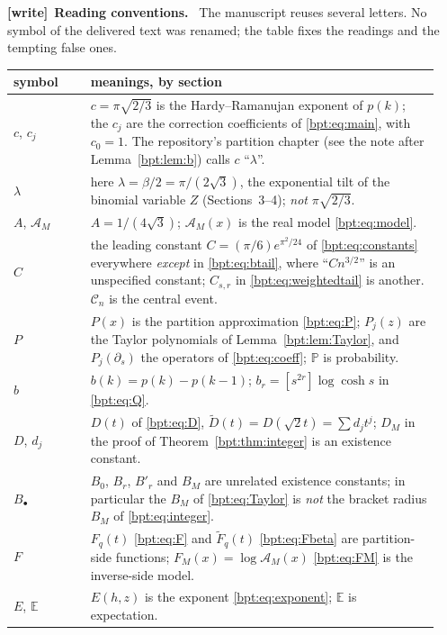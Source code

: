 \documentclass[11pt]{article}
\theoremstyle{remark}\newtheorem{remark}[theorem]{Remark}
\newcommand{\E}{\mathbb E}\newcommand{\Prb}{\mathbb P}
\newenvironment{writenote}[1][]{\par\smallskip\begingroup\small
 \noindent\textbf{[write]}\if\relax\detokenize{#1}\relax\else~\textbf{#1.}\fi\ }%
 {\par\endgroup\smallskip}
\begin{document}
\begin{writenote}[Reading conventions]
The manuscript reuses several letters. No symbol of the delivered text was
renamed; the table fixes the readings and the tempting false ones.

\smallskip
\noindent\begin{tabular}{@{}>{\raggedright\arraybackslash}p{0.17\linewidth}
 >{\raggedright\arraybackslash}p{0.77\linewidth}@{}}
\toprule
symbol & meanings, by section \\
\midrule
$c$, $c_j$ & $c=\pi\sqrt{2/3}$ is the Hardy--Ramanujan exponent of $p(k)$;
 the $c_j$ are the correction coefficients of \eqref{bpt:eq:main}, with
 $c_0=1$. The repository's partition chapter (see the note after
 Lemma~\ref{bpt:lem:b}) calls $c$ ``$\lambda$''. \\
$\lambda$ & here $\lambda=\beta/2=\pi/(2\sqrt3)$, the exponential tilt of the
 binomial variable $Z$ (Sections~3--4); \emph{not} $\pi\sqrt{2/3}$. \\
$A$, $\mathcal A_M$ & $A=1/(4\sqrt3)$; $\mathcal A_M(x)$ is the real model
 \eqref{bpt:eq:model}. \\
$C$ & the leading constant $C=(\pi/6)e^{\pi^2/24}$ of \eqref{bpt:eq:constants}
 everywhere \emph{except} in \eqref{bpt:eq:btail}, where ``$C n^{3/2}$'' is
 an unspecified constant; $C_{s,r}$ in \eqref{bpt:eq:weightedtail} is
 another. $\mathcal C_n$ is the central event. \\
$P$ & $P(x)$ is the partition approximation \eqref{bpt:eq:P}; $P_j(z)$ are
 the Taylor polynomials of Lemma~\ref{bpt:lem:Taylor}, and $P_j(\partial_s)$
 the operators of \eqref{bpt:eq:coeff}; $\Prb$ is probability. \\
$b$ & $b(k)=p(k)-p(k-1)$; $b_r=[s^{2r}]\log\cosh s$ in \eqref{bpt:eq:Q}. \\
$D$, $d_j$ & $D(t)$ of \eqref{bpt:eq:D}, $\widetilde D(t)=D(\sqrt2t)=\sum d_jt^j$;
 $D_M$ in the proof of Theorem~\ref{bpt:thm:integer} is an existence
 constant. \\
$B_\bullet$ & $B_0$, $B_r$, $B'_r$ and $B_M$ are unrelated existence
 constants; in particular the $B_M$ of \eqref{bpt:eq:Taylor} is \emph{not}
 the bracket radius $B_M$ of \eqref{bpt:eq:integer}. \\
$F$ & $F_q(t)$ \eqref{bpt:eq:F} and $\widetilde F_q(t)$ \eqref{bpt:eq:Fbeta}
 are partition-side functions; $F_M(x)=\log\mathcal A_M(x)$
 \eqref{bpt:eq:FM} is the inverse-side model. \\
$E$, $\E$ & $E(h,z)$ is the exponent \eqref{bpt:eq:exponent}; $\E$ is
 expectation. \\

\end{tabular}
\end{writenote}
\end{document}
